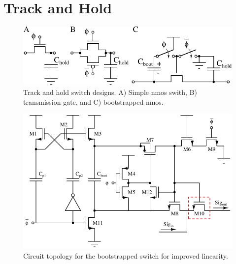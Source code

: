 \documentclass[10pt,journal]{IEEEtran}\usepackage{longtable}
\begin{document}


\section{Track and Hold}
\begin{figure}[tbph]
\begin{center}
\includegraphics[width=1\columnwidth]{Switch_types.pdf}
\caption{Track and hold switch designs. A) Simple nmos swith, B) transmission gate, and C) bootstrapped nmos.}
\label{fig:SwitchTypes}
\end{center}
\end{figure}
\begin{figure}[tbph]
\begin{center}
\includegraphics[width=1\columnwidth]{BootstrappedSwitch.pdf}
\caption{Circuit topology for the bootstrapped switch for improved linearity.}
\label{fig:BootstrappedSwitch}
\end{center}
\end{figure}
\end{document}
